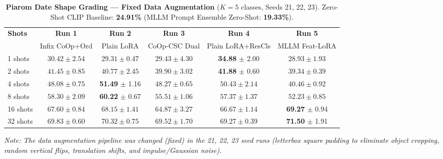 \documentclass[letterpaper,11pt,leqno]{article}
\begin{document}
\begin{table}[H]
\centering
\small
\setlength{\tabcolsep}{4pt}
\caption{\textbf{Piarom Date Shape Grading --- Fixed Data Augmentation} ($K=5$ classes, Seeds 21, 22, 23). Zero-Shot CLIP Baseline: \textbf{24.91\%} (MLLM Prompt Ensemble Zero-Shot: \textbf{19.33\%}).}
\label{tab:piarom_fixed_results}
\begin{tabular*}{\textwidth}{@{\extracolsep{\fill}}lccccc}
\toprule
\multirow{2}{*}{\textbf{Shots}} & \textbf{Run 1} & \textbf{Run 2} & \textbf{Run 3} & \textbf{Run 4} & \textbf{Run 5} \\
 & \scriptsize Infix CoOp+Ord & \scriptsize Plain LoRA & \scriptsize CoOp-CSC Dual & \scriptsize Plain LoRA+ResCls & \scriptsize MLLM Feat-LoRA \\
\midrule
 1 shots & $30.42 \pm 2.54$ & $29.31 \pm 0.47$ & $29.43 \pm 4.30$ & \cellcolor{bestgreen}\textbf{34.88} $\pm$ 2.00 & $28.93 \pm 1.93$ \\
 2 shots & $41.45 \pm 0.85$ & $40.77 \pm 2.45$ & $39.90 \pm 3.02$ & \cellcolor{bestgreen}\textbf{41.88} $\pm$ 0.60 & $39.34 \pm 0.39$ \\
 4 shots & $48.08 \pm 0.75$ & \cellcolor{bestgreen}\textbf{51.49} $\pm$ 1.16 & $48.27 \pm 0.65$ & $50.43 \pm 2.14$ & $40.46 \pm 0.92$ \\
 8 shots & $58.30 \pm 2.09$ & \cellcolor{bestgreen}\textbf{60.22} $\pm$ 0.67 & $55.51 \pm 1.06$ & $57.37 \pm 1.37$ & $52.23 \pm 0.85$ \\
16 shots & $67.60 \pm 0.84$ & $68.15 \pm 1.41$ & $64.87 \pm 3.27$ & $66.67 \pm 1.14$ & \cellcolor{bestgreen}\textbf{69.27} $\pm$ 0.94 \\
32 shots & $69.83 \pm 0.60$ & $70.32 \pm 0.75$ & $69.52 \pm 1.70$ & $69.27 \pm 0.39$ & \cellcolor{bestgreen}\textbf{71.50} $\pm$ 1.91 \\
\bottomrule
\end{tabular*}
\vspace{0.3em}
\raggedright\small \textit{Note: The data augmentation pipeline was changed (fixed) in the 21, 22, 23 seed runs (letterbox square padding to eliminate object cropping, random vertical flips, translation shifts, and impulse/Gaussian noise).}
\end{table}
\end{document}
